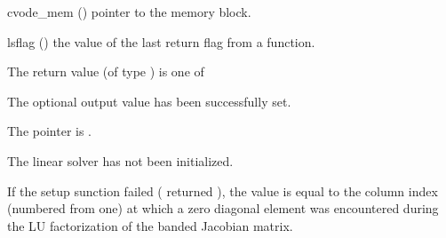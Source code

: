 {
  \begin{args}
  \item[cvode\_mem] ()
    pointer to the {\cvode} memory block.
  \item[lsflag] ()
    the value of the last return flag from a {\cvband} function.
  \end{args}
}
{
  The return value  (of type ) is one of
  \begin{args}
  \item[\Id{CVBAND\_SUCCESS}] 
    The optional output value has been successfully set.
  \item[\Id{CVBAND\_MEM\_NULL}]
    The  pointer is .
  \item[\Id{CVBAND\_LMEM\_NULL}]
    The {\cvband} linear solver has not been initialized.
  \end{args}
}
{
  If the {\cvband} setup sunction failed ( returned ),
  the value  is equal to the column index (numbered from one) at which
  a zero diagonal element was encountered during the LU factorization of the 
  banded Jacobian matrix.
}


